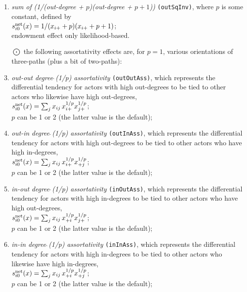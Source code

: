 \documentclass[a4paper,fleqn,11pt]{article}
\newcommand{\+}{\, + \,}
\newcommand{\vit}{\theenumi}
\begin{document}
\begin{enumerate}
 \item {\em sum of (1/(out-degree + $p$)(out-degree + $p+1$))} \texttt{(outSqInv)},
 where $p$ is some constant, defined by  \\
 $s^{\rm net}_{i\vit}(x) = 1/(x_{i+} + p)(x_{i+} + p + 1)$;\\
 endowment effect only likelihood-based.


 \item[{\hspace*{-1ex}$\bigodot$}] the following assortativity effects are,
 for $p=1$, various orientations of three-paths (plus a bit of two-paths):\\

 \item {\em out-out degree$\,\hat{\ }$(1/p) assortativity}
 \texttt{(outOutAss)},
 which represents the differential tendency for actors with high out-degrees
 to be tied to other actors who likewise have high out-degrees,\\
 $s^{\rm net}_{i\vit}(x) = \sum_j x_{ij}\, {x_{i+}^{1/p}} {x_{j+}^{1/p}} $;\\
 $p$ can be 1 or 2 (the latter value is the default);

 \item {\em out-in degree$\,\hat{\ }$(1/p) assortativity}
 \texttt{(outInAss)},
 which represents the differential tendency for actors with high out-degrees
 to be tied to other actors who have high in-degrees,\\
 $s^{\rm net}_{i\vit}(x) = \sum_j x_{ij}\, {x_{i+}^{1/p}} {x_{+j}^{1/p}} $;\\
 $p$ can be 1 or 2 (the latter value is the default);

 \item {\em in-out degree$\,\hat{\ }$(1/p) assortativity}
 \texttt{(inOutAss)},
 which represents the differential tendency for actors with high in-degrees
 to be tied to other actors who have high out-degrees,\\
 $s^{\rm net}_{i\vit}(x) = \sum_j x_{ij}\, {x_{+i}^{1/p}} {x_{j+}^{1/p}} $;\\
 $p$ can be 1 or 2 (the latter value is the default);

 \item {\em in-in degree$\,\hat{\ }$(1/p) assortativity}
 \texttt{(inInAss)},
 which represents the differential tendency for actors with high in-degrees
 to be tied to other actors who likewise have high in-degrees,\\
 $s^{\rm net}_{i\vit}(x) = \sum_j x_{ij}\, {x_{+i}^{1/p}} {x_{+j}^{1/p}} $;\\
 $p$ can be 1 or 2 (the latter value is the default);


\end{enumerate}
\end{document}
